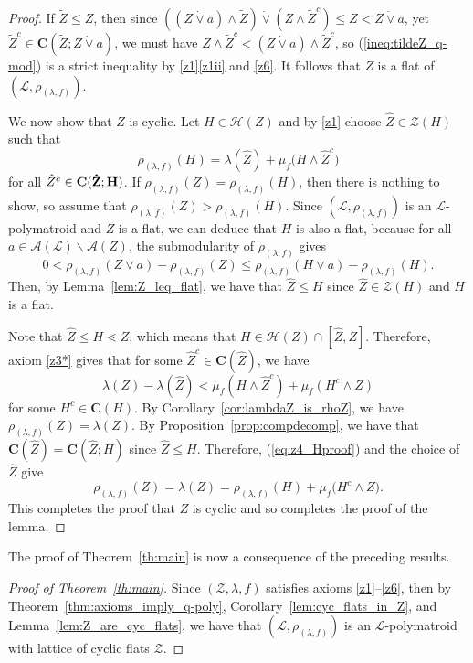 \documentclass[a4paper,11pt,reqno]{article}
\theoremstyle{definition}
\newcommand{\mL}{\mathcal{L}}
\newcommand{\mH}{\mathcal{H}}
\newcommand{\cC}{\textup{\bf{C}}}
\begin{document}
\begin{proof}
    If $\tilde{Z}\leq Z$, then since $((Z\dot\vee a)\wedge\tilde{Z})\dot\vee(Z\wedge\tilde{Z}^c)\leq Z<Z\dot\vee a$, yet $\tilde{Z}^c\in\mathbf{C}(\tilde{Z};Z\dot\vee a)$, we must have $Z\wedge \tilde{Z}^c<(Z\dot\vee a)\wedge\tilde{Z}^c$, so (\ref{ineq:tildeZ_q-mod}) is a strict inequality by \ref{z1}\ref{z1ii} and \ref{z6}. It follows that $Z$ is a flat of $(\mathcal{L},\rho_{(\lambda,f)})$.
     
    We now show that $Z$ is cyclic. Let $H\in\mH(Z)$ and by \ref{z1} choose $\hat{Z}\in\mathcal{Z}(H)$ such that
    \[
    \rho_{(\lambda,f)}(H)=\lambda(\hat{Z})+\mu_f\bigl(H\wedge\hat{Z}^c\bigr)
    \]
    for all $\hat{Z}^c\in\cC(\hat{Z};H)$. If $\rho_{(\lambda,f)}(Z)=\rho_{(\lambda,f)}(H)$, then there is nothing to show, so assume that $\rho_{(\lambda,f)}(Z)>\rho_{(\lambda,f)}(H)$. Since $(\mathcal{L},\rho_{(\lambda,f)})$ is an $\mL$-polymatroid and $Z$ is a flat, we can deduce that $H$ is also a flat, because for all $a\in\mathcal{A}(\mathcal{L})\backslash\mathcal{A}(Z)$, the submodularity of $\rho_{(\lambda,f)}$ gives
    \[
    0<\rho_{(\lambda,f)}(Z\vee a)-\rho_{(\lambda,f)}(Z)\leq \rho_{(\lambda,f)}(H\vee a)-\rho_{(\lambda,f)}(H).
    \]
    Then, by Lemma~\ref{lem:Z_leq_flat}, we have that $\hat{Z}\leq H$ since $\hat{Z}\in\mathcal{Z}(H)$ and $H$ is a flat.

    Note that $\hat{Z}\leq H\lessdot Z$, which means that $H\in\mathcal{H}(Z)\cap[\hat{Z},Z]$. Therefore, axiom \ref{z3*} gives that for some $\hat{Z}^c\in\mathbf{C}(\hat{Z})$, we have
    \begin{equation}\label{eq:z4_Hproof}
        \lambda(Z)-\lambda(\hat{Z})<\mu_f(H\wedge \hat{Z}^c)+\mu_f(H^c\wedge Z)
    \end{equation}
    for some $H^c\in\mathbf{C}(H)$. By Corollary~\ref{cor:lambdaZ_is_rhoZ}, we have $\rho_{(\lambda,f)}(Z)=\lambda(Z)$. By Proposition~\ref{prop:compdecomp}, we have that $\mathbf{C}(\hat{Z})=\mathbf{C}(\hat{Z};H)$ since $\hat{Z}\leq H$. Therefore, (\ref{eq:z4_Hproof}) and the choice of $\hat{Z}$ give 
    $$\rho_{(\lambda,f)}(Z)=\lambda(Z)=\rho_{(\lambda,f)}(H)+\mu_f\bigl(H^c\wedge Z\bigr).$$
    This completes the proof that $Z$ is cyclic and so completes the proof of the lemma.
\end{proof}

The proof of Theorem~\ref{th:main} is now a consequence of the preceding results.

\begin{proof}[Proof of Theorem~\ref{th:main}]
    Since $(\mathcal{Z},\lambda,f)$ satisfies axioms \ref{z1}--\ref{z6}, then by Theorem~\ref{thm:axioms_imply_q-poly}, Corollary~\ref{lem:cyc_flats_in_Z}, and Lemma~\ref{lem:Z_are_cyc_flats}, we have that $(\mathcal{L},\rho_{(\lambda,f)})$ is an $\mL$-polymatroid with lattice of cyclic flats $\mathcal{Z}$.
\end{proof}
\end{document}
